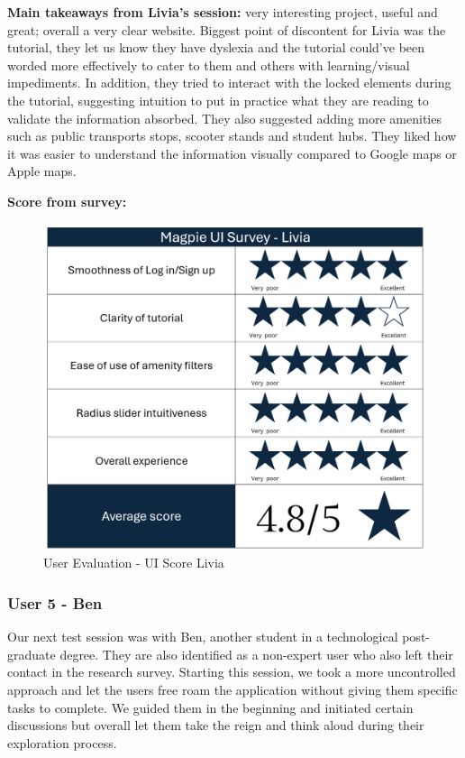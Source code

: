 \noindent\textbf{Main takeaways from Livia's session: }very interesting project,
useful and great; overall a very clear website. Biggest point of discontent for
Livia was the tutorial, they let us know they have dyslexia and the tutorial
could've been worded more effectively to cater to them and others with
learning/visual impediments. In addition, they tried to interact with the locked
elements during the tutorial, suggesting intuition to put in practice what they
are reading to validate the information absorbed. They also suggested adding
more amenities such as public transports stops, scooter stands and student hubs.
They liked how it was easier to understand the information visually compared to
Google maps or Apple maps.

\newpage{}

\textbf{Score from survey: }

\begin{figure}[h!]
    \centering
    \includegraphics[width=\textwidth]{images/survey-livia.png}
    \caption{User Evaluation - UI Score Livia}
\end{figure}

\newpage{}

\subsubsection{User 5 - Ben}
Our next test session was with Ben, another student in a technological
post-graduate degree. They are also identified as a non-expert user who also
left their contact in the research survey. Starting this session, we took a more
uncontrolled approach and let the users free roam the application without giving
them specific tasks to complete. We guided them in the beginning and initiated
certain discussions but overall let them take the reign and think aloud during
their exploration process.

